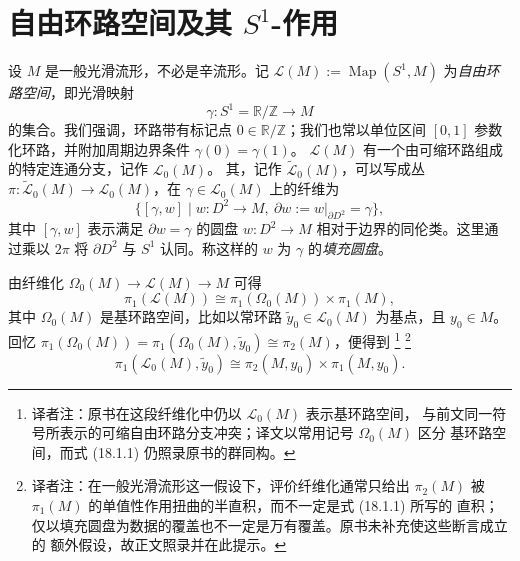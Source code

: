 \section{\texorpdfstring{自由环路空间及其 $S^1$-作用}{自由环路空间及其 S¹-作用}}
\label{sec:free-loop-space-circle-action}

设 $M$ 是一般光滑流形，不必是辛流形。记
$\mathcal L(M):=\operatorname{Map}(S^1,M)$ 为\emph{自由环路空间}，即光滑映射
\[
  \gamma:S^1=\mathbb R/\mathbb Z\longrightarrow M
\]
的集合。我们强调，环路带有标记点 $0\in\mathbb R/\mathbb Z$；我们也常以单位区间
$[0,1]$ 参数化环路，并附加周期边界条件 $\gamma(0)=\gamma(1)$。
$\mathcal L(M)$ 有一个由可缩环路组成的特定连通分支，记作 $\mathcal L_0(M)$。
其\termUniversalCoveringSpace{}，记作 $\widetilde{\mathcal L}_0(M)$，可以写成丛
$\pi:\widetilde{\mathcal L}_0(M)\to\mathcal L_0(M)$，在
$\gamma\in\mathcal L_0(M)$ 上的纤维为
\[
 \{[\gamma,w]\mid w:D^2\to M,\ \partial w:=w|_{\partial D^2}=\gamma\},
\]
其中 $[\gamma,w]$ 表示满足 $\partial w=\gamma$ 的圆盘
$w:D^2\to M$ 相对于边界的同伦类。这里通过乘以 $2\pi$ 将 $\partial D^2$ 与
$S^1$ 认同。称这样的 $w$ 为 $\gamma$ 的\emph{填充圆盘}。

由纤维化 $\Omega_0(M)\to\mathcal L(M)\to M$ 可得
\[
 \pi_1(\mathcal L(M))\cong\pi_1(\Omega_0(M))\times\pi_1(M),
\]
其中 $\Omega_0(M)$ 是基环路空间，比如以常环路
$\widetilde y_0\in\mathcal L_0(M)$ 为基点，且 $y_0\in M$。回忆
$\pi_1(\Omega_0(M))=\pi_1(\Omega_0(M),\widetilde y_0)\cong\pi_2(M)$，便得到
\footnote{译者注：原书在这段纤维化中仍以 $\mathcal L_0(M)$ 表示基环路空间，
与前文同一符号所表示的可缩自由环路分支冲突；译文以常用记号 $\Omega_0(M)$ 区分
基环路空间，而式 (18.1.1) 仍照录原书的群同构。}
\footnote{译者注：在一般光滑流形这一假设下，评价纤维化通常只给出
$\pi_2(M)$ 被 $\pi_1(M)$ 的单值性作用扭曲的半直积，而不一定是式 (18.1.1) 所写的
直积；仅以填充圆盘为数据的覆盖也不一定是万有覆盖。原书未补充使这些断言成立的
额外假设，故正文照录并在此提示。}
\begin{equation}
 \pi_1(\mathcal L_0(M),\widetilde y_0)
 \cong\pi_2(M,y_0)\times\pi_1(M,y_0).
 \label{eq:18-free-loop-fundamental-group}
\end{equation}

